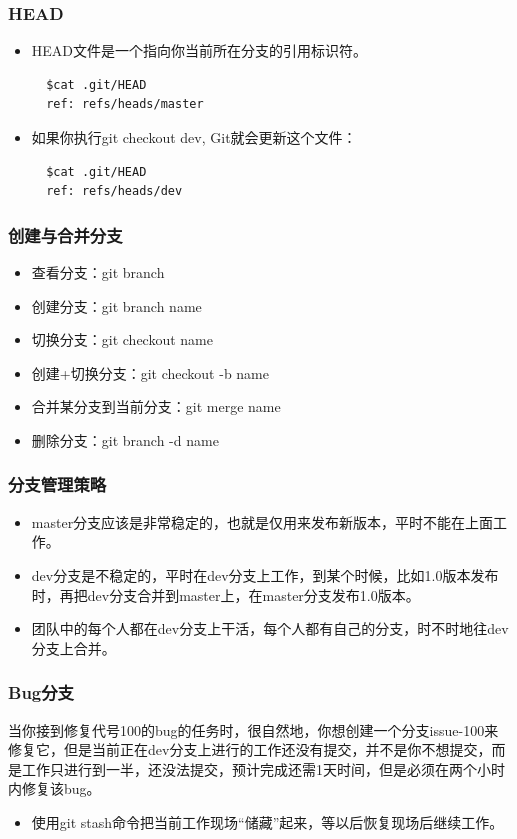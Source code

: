\documentclass[notheorems,mathserif,table,compress]{beamer}  %
\newcommand\zhushadow[2][purple]{\hskip5pt\shadowbox{\color{#1}\small\kai #2\vspace{3mm}}}
\begin{document}
\begin{frame}[fragile]
  \frametitle{HEAD}
  \begin{itemize}
  \item HEAD文件是一个指向你当前所在分支的引用标识符。
  \begin{lstlisting}
  $cat .git/HEAD 
  ref: refs/heads/master
  \end{lstlisting}
  \item 如果你执行git checkout dev, Git就会更新这个文件：
  \begin{lstlisting}
  $cat .git/HEAD 
  ref: refs/heads/dev
  \end{lstlisting}
  \end{itemize}
\end{frame}


\begin{frame}
  \frametitle{创建与合并分支}
  \begin{tcolorbox}[colback=blue!15,colframe=blue!75!black]  
  \begin{itemize}
  \item 查看分支：git branch
  \item 创建分支：git branch name
  \item 切换分支：git checkout name
  \item 创建+切换分支：git checkout -b name
  \item 合并某分支到当前分支：git merge name
  \item 删除分支：git branch -d name
  \end{itemize}
  \end{tcolorbox}
\end{frame}


\begin{frame}
  \frametitle{分支管理策略}
  \begin{itemize}
  \item master分支应该是非常稳定的，也就是仅用来发布新版本，平时不能在上面工作。
  \item dev分支是不稳定的，平时在dev分支上工作，到某个时候，比如1.0版本发布时，再把dev分支合并到master上，在master分支发布1.0版本。
  \item 团队中的每个人都在dev分支上干活，每个人都有自己的分支，时不时地往dev分支上合并。
  \end{itemize}
\end{frame}


\begin{frame}
  \frametitle{Bug分支}
  \zhushadow{应用场景} 当你接到修复代号100的bug的任务时，很自然地，你想创建一个分支issue-100来修复它，但是当前正在dev分支上进行的工作还没有提交，并不是你不想提交，而是工作只进行到一半，还没法提交，预计完成还需1天时间，但是必须在两个小时内修复该bug。
  
  \begin{itemize}
  \item 使用git stash命令把当前工作现场“储藏”起来，等以后恢复现场后继续工作。
  
  \end{itemize}
\end{frame}
\end{document}
